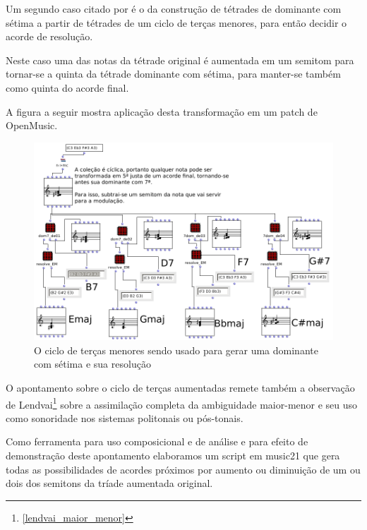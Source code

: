 \documentclass[
	12pt,				%
	openright,			%
	twoside,			%
	a4paper,			%
	english,			%
	french,				%
	spanish,			%
	brazil				%
	]{abntex2}
\begin{document}

Um segundo caso citado por  é o da construção de tétrades de dominante com sétima a partir de tétrades de um ciclo de terças menores, para então decidir o acorde de resolução. 

Neste caso uma das notas da tétrade original é aumentada em um semitom para tornar-se a quinta da tétrade dominante com sétima, para manter-se também como quinta do acorde final.

\pagebreak
A figura a seguir mostra aplicação desta transformação em um patch de OpenMusic.


\begin{figure}[!h]
	\caption{\label{fig_grafico}O ciclo de terças menores sendo usado para gerar uma dominante com sétima e sua resolução   }
	\begin{center}
	    \includegraphics[scale=0.5]{ciclos/setimadominante.png}
	\end{center}
\end{figure}

O apontamento sobre o ciclo de terças aumentadas remete também a observação de Lendvai\footnote{ \autoref{lendvai_maior_menor} } sobre a assimilação completa da ambiguidade maior-menor e seu uso como sonoridade nos sistemas politonais ou pós-tonais. 

Como ferramenta para uso composicional e de análise e para efeito de demonstração deste apontamento elaboramos um script em music21 que gera todas as possibilidades de acordes próximos por aumento ou diminuição de um ou dois dos semitons da tríade aumentada original. 
\end{document}
